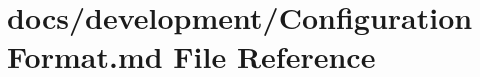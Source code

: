 \hypertarget{Configuration_01Format_8md}{\section{docs/development/\+Configuration Format.\+md File Reference}
\label{Configuration_01Format_8md}
}
